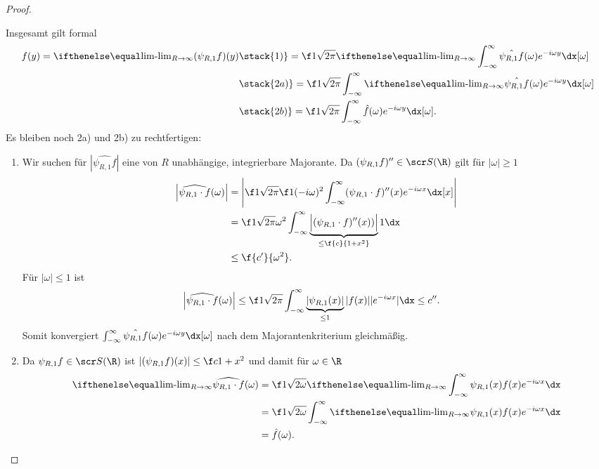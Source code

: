 \begin{st}
\begin{proof}
\begin{enumerate}[1)]
				Insgesamt gilt formal
				\begin{align*}
					f(y)
					= \lim_{R\to\infty} (\psi_{R,1} f)(y)
					&\stack{1)}= \f 1{\sqrt{2\pi}} \lim_{R\to\infty} \int_{-\infty}^\infty \hat{\psi_{R,1}f}(\omega) e^{-i\omega y} \dx[\omega] \\
					&\stack{2a)}= \f 1{\sqrt{2\pi}} \int_{-\infty}^\infty \lim_{R\to\infty} \hat{\psi_{R,1}f}(\omega) e^{-i\omega y} \dx[\omega] \\
					&\stack{2b)}= \f 1{\sqrt{2\pi}} \int_{-\infty}^\infty \hat{f}(\omega) e^{-i\omega y} \dx[\omega].
				\end{align*}
				Es bleiben noch 2a) und 2b) zu rechtfertigen:
				\begin{enumerate}[{2}a)]
					\item
						Wir suchen für $|\hat{\psi_{R,1}f}|$ eine von $R$ unabhängige, integrierbare Majorante.
						Da $(\psi_{R,1}f)'' \in \scr S(\R)$ gilt für $|\omega| \ge 1$
						\begin{align*}
							\Big|\widehat{\psi_{R,1} \cdot f}(\omega)  \Big|
							&= \Bigg| \f 1{\sqrt{2\pi}} \f 1{(-i\omega)^2} \int_{-\infty}^\infty (\psi_{R,1}\cdot f)''(x) e^{-i \omega x} \dx[x] \Bigg| \\
							&= \f 1{\sqrt{2\pi} \omega^2} \int_{-\infty}^\infty \underbrace{\Big| (\psi_{R,1} \cdot f)'' (x))\Big|}_{\le \f {c}{1+x^2}} 1 \dx \\
							&\le \f {c'}{\omega^2}.
						\end{align*}
						Für $|\omega| \le 1$ ist
						\begin{align*}
							\Big|\widehat{\psi_{R,1} \cdot f}(\omega)  \Big|
							&\le  \f 1{\sqrt{2\pi}} \int_{-\infty}^\infty \underbrace{|\psi_{R,1}(x)|}_{\le 1} |f(x)| |e^{-i\omega x}| \dx
							\le c''.
						\end{align*}
						Somit konvergiert $\int_{-\infty}^\infty \hat{\psi_{R,1}f}(\omega) e^{-i\omega y} \dx[\omega]$ nach dem Majorantenkriterium gleichmäßig.
					\item
						Da $\psi_{R,1}f \in \scr S(\R)$ ist $|(\psi_{R,1}f)(x)| \le \f c{1+x^2}$ und damit für $\omega \in \R$
						\begin{align*}
							\lim_{R\to \infty} \widehat{\psi_{R,1} \cdot f}(\omega)
							&= \f 1{\sqrt{2\omega}} \lim_{R\to\infty} \int_{-\infty}^\infty \psi_{R,1}(x) f(x) e^{-i \omega x} \dx \\
							&= \f 1{\sqrt{2\omega}} \int_{-\infty}^\infty \lim_{R\to\infty} \psi_{R,1}(x) f(x) e^{-i \omega x} \dx \\
							&= \hat f(\omega).
						\end{align*}
				\end{enumerate}


\end{enumerate}
\end{proof}
\end{st}
